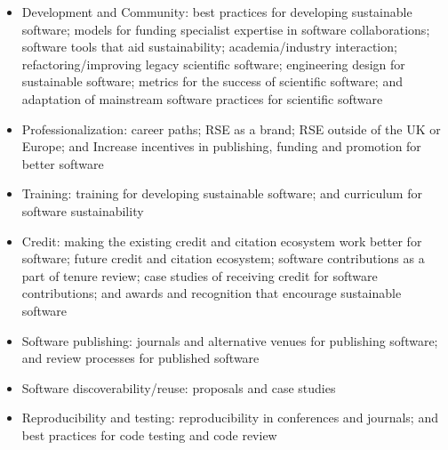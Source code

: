 \documentclass[11pt, oneside]{amsart}
\newcommand{\todo}[1]{{\color{blue}$\blacksquare$~\textsf{[TODO: #1]}}}
\begin{document}
\begin{itemize}
\renewcommand{\labelenumi}{\textbf{\theenumi}.}
\setlength{\rightmargin}{1em}

\item Development and Community:
best practices for developing sustainable software;
models for funding specialist expertise in software collaborations;
software tools that aid sustainability;
academia/industry interaction;
refactoring/improving legacy scientific software;
engineering design for sustainable software;
metrics for the success of scientific software; and
adaptation of mainstream software practices for scientific software

\item Professionalization:
career paths;
RSE as a brand;
RSE outside of the UK or Europe; and
Increase incentives in publishing, funding and promotion for better software

\item Training:
training for developing sustainable software; and
curriculum for software sustainability

\item Credit:
making the existing credit and citation ecosystem work better for software;
future credit and citation ecosystem;
software contributions as a part of tenure review;
case studies of receiving credit for software contributions; and
awards and recognition that encourage sustainable software

\item Software publishing:
journals and alternative venues for publishing software; and
review processes for published software

\item Software discoverability/reuse:
proposals and case studies

\item Reproducibility and testing:
reproducibility in conferences and journals; and
best practices for code testing and code review

\end{itemize}

\end{document}
